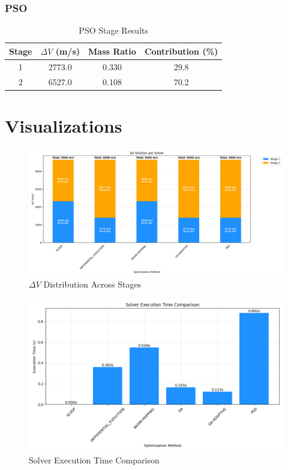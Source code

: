 \documentclass{article}
\begin{document}
\subsubsection{PSO}
\begin{table}[H]
\centering
\caption{PSO Stage Results}
\begin{tabular}{cccc}
\toprule
Stage & $\Delta V$ (m/s) & Mass Ratio & Contribution (\%) \\
\midrule
1 & 2773.0 & 0.330 & 29.8 \\
2 & 6527.0 & 0.108 & 70.2 \\
\bottomrule
\end{tabular}
\end{table}

\section{Visualizations}
\begin{figure}[H]
\centering
\includegraphics[width=\textwidth]{dv_breakdown.png}
\caption{$\Delta V$ Distribution Across Stages}
\end{figure}

\begin{figure}[H]
\centering
\includegraphics[width=\textwidth]{execution_time.png}
\caption{Solver Execution Time Comparison}
\end{figure}
\end{document}
